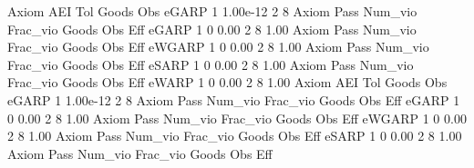 {\smallskip}
       Axiom {\VBAR}       AEI        Tol      Goods        Obs 
       eGARP {\VBAR}         1   1.00e-12          2          8 
{\smallskip}
{\smallskip}
{\smallskip}
       Axiom {\VBAR} Pass     Num_vio    Frac_vio       Goods         Obs         Eff  
       eGARP {\VBAR}    1           0        0.00           2           8        1.00  
{\smallskip}
{\smallskip}
{\smallskip}
       Axiom {\VBAR} Pass     Num_vio    Frac_vio       Goods         Obs         Eff  
      eWGARP {\VBAR}    1           0        0.00           2           8        1.00  
{\smallskip}
{\smallskip}
{\smallskip}
       Axiom {\VBAR} Pass     Num_vio    Frac_vio       Goods         Obs         Eff  
       eSARP {\VBAR}    1           0        0.00           2           8        1.00  
{\smallskip}
{\smallskip}
{\smallskip}
       Axiom {\VBAR} Pass     Num_vio    Frac_vio       Goods         Obs         Eff  
       eWARP {\VBAR}    1           0        0.00           2           8        1.00  
{\smallskip}
       Axiom {\VBAR}       AEI        Tol      Goods        Obs 
       eGARP {\VBAR}         1   1.00e-12          2          8 
{\smallskip}
{\smallskip}
{\smallskip}
       Axiom {\VBAR} Pass     Num_vio    Frac_vio       Goods         Obs         Eff  
       eGARP {\VBAR}    1           0        0.00           2           8        1.00  
{\smallskip}
{\smallskip}
{\smallskip}
       Axiom {\VBAR} Pass     Num_vio    Frac_vio       Goods         Obs         Eff  
      eWGARP {\VBAR}    1           0        0.00           2           8        1.00  
{\smallskip}
{\smallskip}
{\smallskip}
       Axiom {\VBAR} Pass     Num_vio    Frac_vio       Goods         Obs         Eff  
       eSARP {\VBAR}    1           0        0.00           2           8        1.00  
{\smallskip}
{\smallskip}
{\smallskip}
       Axiom {\VBAR} Pass     Num_vio    Frac_vio       Goods         Obs         Eff  
